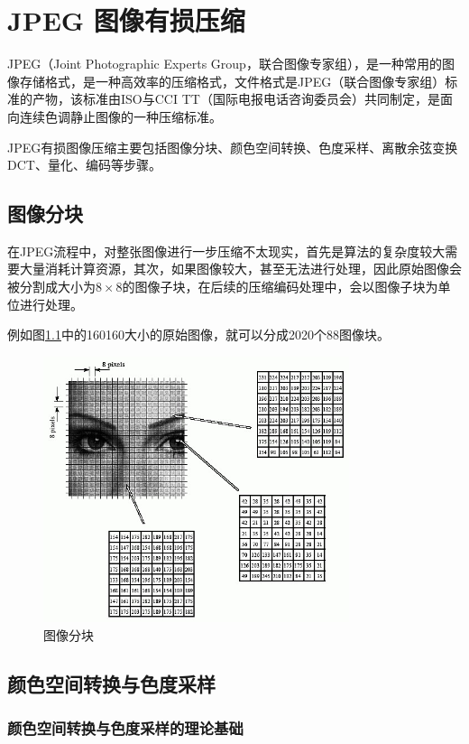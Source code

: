 \chapter{JPEG 图像有损压缩}
JPEG（Joint Photographic Experts Group，联合图像专家组），是一种常用的图像存储格式，是一种高效率的压缩格式，文件格式是JPEG（联合图像专家组）标准的产物，该标准由ISO与CCI TT（国际电报电话咨询委员会）共同制定，是面向连续色调静止图像的一种压缩标准。

JPEG有损图像压缩主要包括图像分块、颜色空间转换、色度采样、离散余弦变换DCT、量化、编码等步骤。

\section{图像分块}
在JPEG流程中，对整张图像进行一步压缩不太现实，首先是算法的复杂度较大需要大量消耗计算资源，其次，如果图像较大，甚至无法进行处理，因此原始图像会被分割成大小为$8\times 8$的图像子块，在后续的压缩编码处理中，会以图像子块为单位进行处理。

例如图\ref{Fig.patch}中的160\times160大小的原始图像，就可以分成20\times20个8\times8图像块。
\begin{figure}[!htb]
    \centering
    \includegraphics[width=0.8\textwidth]{pages/jpeg/patch.jpg}
    \caption{图像分块}
    \label{Fig.patch}
\end{figure}

\section{颜色空间转换与色度采样}
\subsection{颜色空间转换与色度采样的理论基础}

